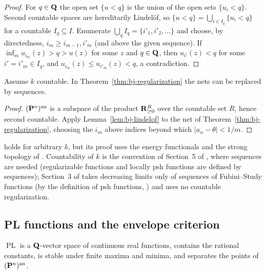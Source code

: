 \begin{proof}
For $q\in\mathbf{Q}$ the open set $\{u<q\}$ is the union of the open sets $\{u_i<q\}$. Second countable spaces
are hereditarily Lindel\"of, so $\{u<q\}=\bigcup_{i\in I_q}\{u_i<q\}$ for a countable $I_q\subseteq I$.
Enumerate $\bigcup_qI_q=\{i'_1,i'_2,\dots\}$ and choose, by directedness, $i_m\ge i_{m-1},i'_m$ (and
above the given sequence). If $\inf_mu_{i_m}(z)>q>u(z)$ for some $z$ and $q\in\mathbf{Q}$, then
$u_{i'}(z)<q$ for some $i'=i'_m\in I_q$, and $u_{i_m}(z)\le u_{i'_m}(z)<q$, a contradiction.
\end{proof}

\begin{corollary}\label{cor:bj-countable-regularization}
\leanok
{}
Assume $k$ countable. In Theorem~\ref{thm:bj-regularization} the nets can be replaced by sequences.
\end{corollary}

\begin{proof}
$(\mathbf{P}^n)^{\mathrm{an}}$ is a subspace of the product $\mathbf{R}_{\ge0}^{R}$ over the countable set $R$, hence second
countable. Apply Lemma~\ref{lem:bj-lindelof} to the net of Theorem~\ref{thm:bj-regularization}, choosing
the $i_m$ above indices beyond which $|a_\alpha-\theta|<1/m$.
\end{proof}

\begin{remark}\label{rmk:bj-countable-deviation}
\cite[Corollary~12.18]{BJ22} holds for arbitrary $k$, but its proof uses the energy functionals and the
strong topology of \cite[\S\S7--12]{BJ22}. Countability of $k$ is the convention of Section~5 of
\cite{FHX}, where sequences are needed (regularizable functions and locally psh functions are defined by
sequences); Section~3 of \cite{FHX} takes decreasing limits only of sequences of Fubini--Study functions (by the definition of psh
functions, \cite[Definition~4.1]{BJ22}) and uses no countable regularization.
\end{remark}

\subsection{PL functions and the envelope criterion}

\begin{lemma}\label{lem:bj-pl-lattice}
\leanok
{}
$\operatorname{PL}$ is a $\mathbf{Q}$-vector space of continuous real functions, contains the rational constants,
is stable under finite maxima and minima, and separates the points of $(\mathbf{P}^n)^{\mathrm{an}}$.
\end{lemma}

